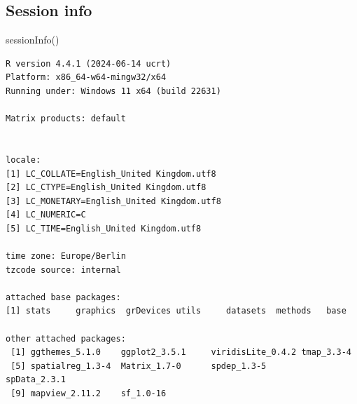 \documentclass[
  letterpaper,
]{scrbook}
\newenvironment{Shaded}{\begin{snugshade}}{\end{snugshade}}
\newcommand{\FunctionTok}[1]{\textcolor[rgb]{0.28,0.35,0.67}{#1}}
\newcommand{\NormalTok}[1]{\textcolor[rgb]{0.00,0.23,0.31}{#1}}
\begin{document}
\hypertarget{session-info-3}{%
\subsection*{Session info}\label{session-info-3}}

\begin{Shaded}
\begin{Highlighting}[]
\FunctionTok{sessionInfo}\NormalTok{()}
\end{Highlighting}
\end{Shaded}

\begin{verbatim}
R version 4.4.1 (2024-06-14 ucrt)
Platform: x86_64-w64-mingw32/x64
Running under: Windows 11 x64 (build 22631)

Matrix products: default


locale:
[1] LC_COLLATE=English_United Kingdom.utf8 
[2] LC_CTYPE=English_United Kingdom.utf8   
[3] LC_MONETARY=English_United Kingdom.utf8
[4] LC_NUMERIC=C                           
[5] LC_TIME=English_United Kingdom.utf8    

time zone: Europe/Berlin
tzcode source: internal

attached base packages:
[1] stats     graphics  grDevices utils     datasets  methods   base     

other attached packages:
 [1] ggthemes_5.1.0    ggplot2_3.5.1     viridisLite_0.4.2 tmap_3.3-4       
 [5] spatialreg_1.3-4  Matrix_1.7-0      spdep_1.3-5       spData_2.3.1     
 [9] mapview_2.11.2    sf_1.0-16        


\end{verbatim}
\end{document}
